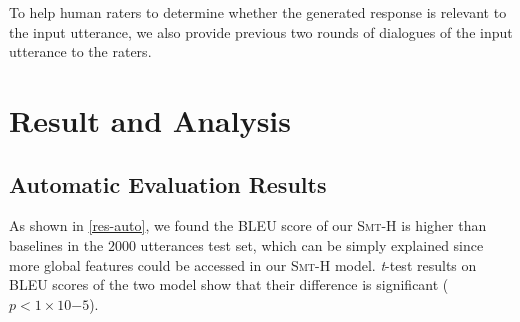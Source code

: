 \documentclass[letterpaper]{article} %
\begin{document}
\begin{CJK*}{UTF8}{gbsn}

To help human raters to determine whether the generated response is relevant to the input utterance, we also provide previous two rounds of dialogues of the input utterance to the raters. 

\section{Result and Analysis}
\subsection{Automatic Evaluation Results}

As shown in \ref{res-auto}, we found the BLEU score of our \textsc{Smt-H} is higher than baselines in the $2000$ utterances test set, which can be simply explained since more global features could be accessed in our \textsc{Smt-H} model. 
	\textit{t}-test results on BLEU scores of the two model show that their difference is significant ($p< 1\times 10{-5}$).


\end{CJK*}
\end{document}

